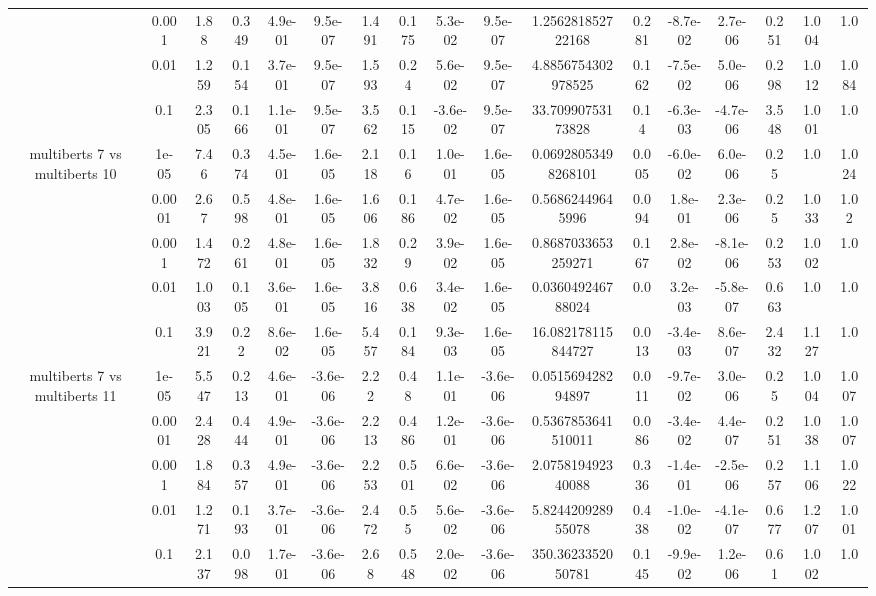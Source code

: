 \begin{tabular}{|c|c|c|c|c|c|c|c|c|c|c|c|c|c|c|c|c|}
 & 0.001 & 1.88 & 0.349 & 4.9e-01 & 9.5e-07 & 1.491 & 0.175 & 5.3e-02 & 9.5e-07 & 1.256281852722168 & 0.281 & -8.7e-02 & 2.7e-06 & 0.251 & 1.004 & 1.0 \\
 & 0.01 & 1.259 & 0.154 & 3.7e-01 & 9.5e-07 & 1.593 & 0.24 & 5.6e-02 & 9.5e-07 & 4.8856754302978525 & 0.162 & -7.5e-02 & 5.0e-06 & 0.298 & 1.012 & 1.084 \\
 & 0.1 & 2.305 & 0.166 & 1.1e-01 & 9.5e-07 & 3.562 & 0.115 & -3.6e-02 & 9.5e-07 & 33.70990753173828 & 0.14 & -6.3e-03 & -4.7e-06 & 3.548 & 1.001 & 1.0 \\
\hline
\multirow{5}{*}{multiberts 7 vs multiberts 10} & 1e-05 & 7.46 & 0.374 & 4.5e-01 & 1.6e-05 & 2.118 & 0.16 & 1.0e-01 & 1.6e-05 & 0.06928053498268101 & 0.005 & -6.0e-02 & 6.0e-06 & 0.25 & 1.0 & 1.024 \\
 & 0.0001 & 2.67 & 0.598 & 4.8e-01 & 1.6e-05 & 1.606 & 0.186 & 4.7e-02 & 1.6e-05 & 0.56862449645996 & 0.094 & 1.8e-01 & 2.3e-06 & 0.25 & 1.033 & 1.02 \\
 & 0.001 & 1.472 & 0.261 & 4.8e-01 & 1.6e-05 & 1.832 & 0.29 & 3.9e-02 & 1.6e-05 & 0.8687033653259271 & 0.167 & 2.8e-02 & -8.1e-06 & 0.253 & 1.002 & 1.0 \\
 & 0.01 & 1.003 & 0.105 & 3.6e-01 & 1.6e-05 & 3.816 & 0.638 & 3.4e-02 & 1.6e-05 & 0.036049246788024 & 0.0 & 3.2e-03 & -5.8e-07 & 0.663 & 1.0 & 1.0 \\
 & 0.1 & 3.921 & 0.22 & 8.6e-02 & 1.6e-05 & 5.457 & 0.184 & 9.3e-03 & 1.6e-05 & 16.082178115844727 & 0.013 & -3.4e-03 & 8.6e-07 & 2.432 & 1.127 & 1.0 \\
\hline
\multirow{5}{*}{multiberts 7 vs multiberts 11} & 1e-05 & 5.547 & 0.213 & 4.6e-01 & -3.6e-06 & 2.22 & 0.48 & 1.1e-01 & -3.6e-06 & 0.051569428294897 & 0.011 & -9.7e-02 & 3.0e-06 & 0.25 & 1.004 & 1.007 \\
 & 0.0001 & 2.428 & 0.444 & 4.9e-01 & -3.6e-06 & 2.213 & 0.486 & 1.2e-01 & -3.6e-06 & 0.5367853641510011 & 0.086 & -3.4e-02 & 4.4e-07 & 0.251 & 1.038 & 1.007 \\
 & 0.001 & 1.884 & 0.357 & 4.9e-01 & -3.6e-06 & 2.253 & 0.501 & 6.6e-02 & -3.6e-06 & 2.075819492340088 & 0.336 & -1.4e-01 & -2.5e-06 & 0.257 & 1.106 & 1.022 \\
 & 0.01 & 1.271 & 0.193 & 3.7e-01 & -3.6e-06 & 2.472 & 0.55 & 5.6e-02 & -3.6e-06 & 5.824420928955078 & 0.438 & -1.0e-02 & -4.1e-07 & 0.677 & 1.207 & 1.001 \\
 & 0.1 & 2.137 & 0.098 & 1.7e-01 & -3.6e-06 & 2.68 & 0.548 & 2.0e-02 & -3.6e-06 & 350.3623352050781 & 0.145 & -9.9e-02 & 1.2e-06 & 0.61 & 1.002 & 1.0 \\

\end{tabular}
